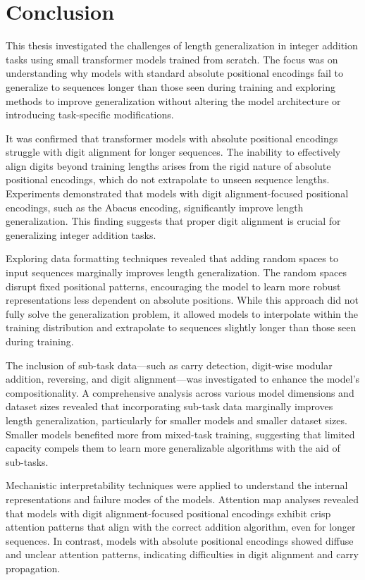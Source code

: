 \chapter{Conclusion}\label{conclusion}

This thesis investigated the challenges of length generalization in integer addition tasks using small transformer models trained from scratch. The focus was on understanding why models with standard absolute positional encodings fail to generalize to sequences longer than those seen during training and exploring methods to improve generalization without altering the model architecture or introducing task-specific modifications.

It was confirmed that transformer models with absolute positional encodings struggle with digit alignment for longer sequences. The inability to effectively align digits beyond training lengths arises from the rigid nature of absolute positional encodings, which do not extrapolate to unseen sequence lengths. Experiments demonstrated that models with digit alignment-focused positional encodings, such as the Abacus encoding, significantly improve length generalization. This finding suggests that proper digit alignment is crucial for generalizing integer addition tasks.

Exploring data formatting techniques revealed that adding random spaces to input sequences marginally improves length generalization. The random spaces disrupt fixed positional patterns, encouraging the model to learn more robust representations less dependent on absolute positions. While this approach did not fully solve the generalization problem, it allowed models to interpolate within the training distribution and extrapolate to sequences slightly longer than those seen during training.

The inclusion of sub-task data—such as carry detection, digit-wise modular addition, reversing, and digit alignment—was investigated to enhance the model's compositionality. A comprehensive analysis across various model dimensions and dataset sizes revealed that incorporating sub-task data marginally improves length generalization, particularly for smaller models and smaller dataset sizes. Smaller models benefited more from mixed-task training, suggesting that limited capacity compels them to learn more generalizable algorithms with the aid of sub-tasks.

Mechanistic interpretability techniques were applied to understand the internal representations and failure modes of the models. Attention map analyses revealed that models with digit alignment-focused positional encodings exhibit crisp attention patterns that align with the correct addition algorithm, even for longer sequences. In contrast, models with absolute positional encodings showed diffuse and unclear attention patterns, indicating difficulties in digit alignment and carry propagation.

